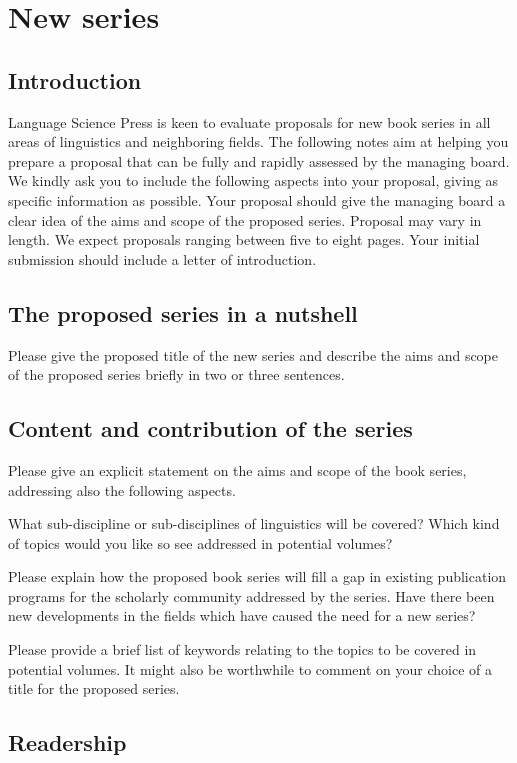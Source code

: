 \chapter{New series}
\section{Introduction}
Language Science Press is keen to evaluate proposals for new book series in all areas
of linguistics and neighboring fields. The following notes aim at
helping you prepare a proposal that can be fully and rapidly assessed
by the managing board. We kindly ask you to include the following
aspects into your proposal, giving as specific information as possible.
Your proposal should give the managing board a clear idea of the aims
and scope of the proposed series. Proposal may vary in length. We
expect proposals ranging between five to eight pages. Your initial
submission should include a letter of introduction.


\section{The proposed series in a nutshell}

Please give the proposed title of the new series and describe the
aims and scope of the proposed series briefly in two or three sentences.


\section{Content and contribution of the series}

Please give an explicit statement on the aims and scope of the book
series, addressing also the following aspects.

What sub-discipline or sub-disciplines of linguistics will be covered?
Which kind of topics would you like so see addressed in potential
volumes?

Please explain how the proposed book series will fill a gap in existing
publication programs for the scholarly community addressed by the
series. Have there been new developments in the fields which have
caused the need for a new series?

Please provide a brief list of keywords relating to the topics to
be covered in potential volumes. It might also be worthwhile to comment
on your choice of a title for the proposed series.


\section{Readership}


